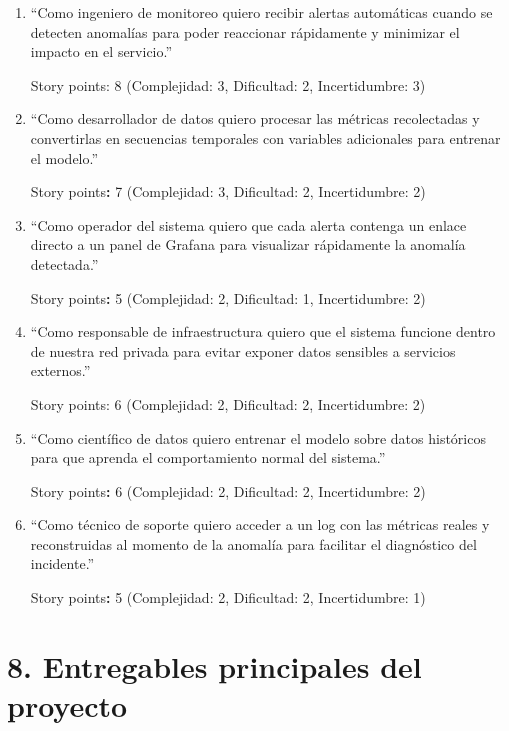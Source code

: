 \documentclass[
11pt, %
]{charter}
\begin{document}
\begin{enumerate}
    \item “Como ingeniero de monitoreo quiero recibir alertas automáticas cuando se detecten anomalías para poder reaccionar rápidamente y minimizar el impacto en el servicio.”

 Story points: 8 (Complejidad: 3, Dificultad: 2, Incertidumbre: 3)
    \item “Como desarrollador de datos quiero procesar las métricas recolectadas y convertirlas en secuencias temporales con variables adicionales para entrenar el modelo.”

 Story points\textbf{:} 7 (Complejidad: 3, Dificultad: 2, Incertidumbre: 2)
    \item “Como operador del sistema quiero que cada alerta contenga un enlace directo a un panel de Grafana para visualizar rápidamente la anomalía detectada.”

 Story points\textbf{:} 5 (Complejidad: 2, Dificultad: 1, Incertidumbre: 2)
    \item “Como responsable de infraestructura quiero que el sistema funcione dentro de nuestra red privada para evitar exponer datos sensibles a servicios externos.”

 Story points: 6 (Complejidad: 2, Dificultad: 2, Incertidumbre: 2)
    \item “Como científico de datos quiero entrenar el modelo sobre datos históricos para que aprenda el comportamiento normal del sistema.”

 Story points\textbf{:} 6 (Complejidad: 2, Dificultad: 2, Incertidumbre: 2)
    \item “Como técnico de soporte quiero acceder a un log con las métricas reales y reconstruidas al momento de la anomalía para facilitar el diagnóstico del incidente.”

 Story points\textbf{:} 5 (Complejidad: 2, Dificultad: 2, Incertidumbre: 1)
\end{enumerate}


\section{8. Entregables principales del proyecto}
\label{sec:entregables}
\end{document}
